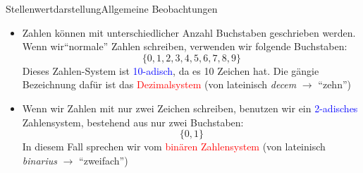 \begin{frame}{Stellenwertdarstellung}{Allgemeine Beobachtungen}

\begin{itemize}
    \item Zahlen können mit unterschiedlicher Anzahl Buchstaben geschrieben werden. Wenn wir``normale'' Zahlen schreiben, verwenden wir folgende Buchstaben:
    $$\{0,1,2,3,4,5,6,7,8,9\}$$
    Dieses Zahlen-System ist \textcolor{blue}{10-adisch}, da es 10 Zeichen hat. Die gängie Bezeichnung dafür ist das \textcolor{red}{Dezimalsystem} (von lateinisch \textit{decem} 
    $\rightarrow$ ``zehn'')
    \item Wenn wir Zahlen mit nur zwei Zeichen schreiben, benutzen wir ein \textcolor{blue}{2-adisches} Zahlensystem, bestehend aus nur zwei Buchstaben:
    $$\{0,1\}$$
    In diesem Fall sprechen wir vom \textcolor{red}{binären Zahlensystem} (von lateinisch \textit{binarius} $\rightarrow$ ``zweifach'')
    \end{itemize}
\end{frame}


